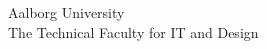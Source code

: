 \begin{titlepage}
\begin{center}
  \vspace{3mm}
    
  \end{center}
  \vfill
  \begin{center}
  Aalborg University\\
  The Technical Faculty for IT and Design
  \end{center}
\end{titlepage}
\clearpage


